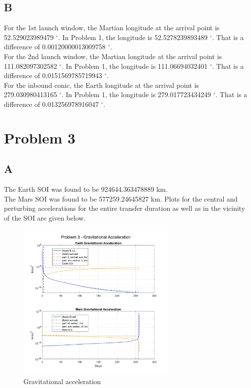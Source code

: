 \documentclass[conf]{new-aiaa}
\begin{document}
\subsection*{B}

For the 1st launch window, the Martian longitude at the arrival point is 52.529023989479 $^\circ$. In Problem 1, the longitude is 52.5278239893489 $^\circ$. That is a difference of 0.00120000013009758 $^\circ$. \\ 

For the 2nd launch window, the Martian longitude at the arrival point is 111.082097302582 $^\circ$. In Problem 1, the longitude is 111.06694032401 $^\circ$. That is a difference of 0.0151569785719943 $^\circ$. \\ 

For the inbound conic, the Earth longitude at the arrival point is 279.030980413165 $^\circ$. In Problem 1, the longitude is 279.017723434249 $^\circ$. That is a difference of 0.013256978916047 $^\circ$. 


\section*{Problem 3}

\subsection*{A}

The Earth SOI was found to be 924644.363478889 km. \\ 

The Mars SOI was found to be 577259.24645827 km. Plots for the central and perturbing accelerations for the entire transfer duration as well as in the vicinity of the SOI are given below. 

\begin{figure}[H]
    \centering 
    \includegraphics[width=0.7\textwidth]{Problem 3 - Gravitational Acceleration.pdf}
    \caption{Gravitational acceleration}
\end{figure}
\end{document}
